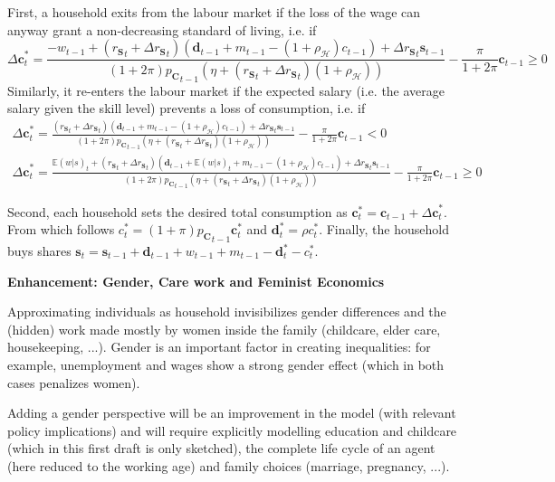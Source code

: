 \documentclass[a4paper, headings=standardclasses]{scrartcl}
\newenvironment{enh}[1][]{\begin{framed}\noindent\textbf{Enhancement: #1}\par}{\end{framed}}
\begin{document}
First, a household exits from the labour market if the loss of the wage can anyway grant a non-decreasing standard of living, i.e. if
$$ {\Delta \mathbf{c}}^*_t = \frac{-w_{t-1} + ({r_\mathbf{S}}_t + {\Delta r_\mathbf{S}}_{t})(\mathbf{d}_{t-1} + m_{t-1} - (1+\rho_{\mathcal{H}}) c_{t-1}) + {\Delta r_\mathbf{S}}_{t} \mathbf{s}_{t-1}}{(1+2\pi){p_\mathbf{C}}_{t-1}(\eta +  ({r_\mathbf{S}}_t + {\Delta r_\mathbf{S}}_{t})(1+\rho_{\mathcal{H}}))} - \frac{\pi}{1+2\pi}{\mathbf{c}_{t-1}} \ge 0$$
Similarly, it re-enters the labour market if the expected salary (i.e. the average salary given the skill level) prevents a loss of consumption, i.e. if
\begin{multline*}
	{\Delta \mathbf{c}}^*_t = \frac{({r_\mathbf{S}}_t + {\Delta r_\mathbf{S}}_{t})(\mathbf{d}_{t-1} + m_{t-1} - (1+\rho_{\mathcal{H}}) c_{t-1}) + {\Delta r_\mathbf{S}}_{t} \mathbf{s}_{t-1}}{(1+2\pi){p_\mathbf{C}}_{t-1}(\eta +  ({r_\mathbf{S}}_t + {\Delta r_\mathbf{S}}_{t})(1+\rho_{\mathcal{H}}))} - \frac{\pi}{1+2\pi}{\mathbf{c}_{t-1}} < 0 \\
	{\Delta \mathbf{c}}^*_t = \frac{{\mathbb{E}(w|s)}_{t} + ({r_\mathbf{S}}_t + {\Delta r_\mathbf{S}}_{t})(\mathbf{d}_{t-1} + {\mathbb{E}(w|s)}_{t} + m_{t-1} - (1+\rho_{\mathcal{H}}) c_{t-1}) + {\Delta r_\mathbf{S}}_{t} \mathbf{s}_{t-1}}{(1+2\pi){p_\mathbf{C}}_{t-1}(\eta +  ({r_\mathbf{S}}_t + {\Delta r_\mathbf{S}}_{t})(1+\rho_{\mathcal{H}}))} - \frac{\pi}{1+2\pi}{\mathbf{c}_{t-1}} \ge 0
\end{multline*}

Second, each household sets the desired total consumption as $\mathbf{c}^*_t = \mathbf{c}_{t-1} + {\Delta \mathbf{c}}^*_t$. From which follows $c^*_t = (1+\pi) {p_\mathbf{C}}_{t-1} \mathbf{c}^*_t$ and $\mathbf{d}^*_t = \rho c^*_t$. Finally, the household buys shares $\mathbf{s}_t = \mathbf{s}_{t-1} + \mathbf{d}_{t-1} + w_{t-1} + m_{t-1} - \mathbf{d}^*_t - c^*_t$.

\begin{enh}[Gender, Care work and Feminist Economics]
	Approximating individuals as household invisibilizes gender differences and the (hidden) work made mostly by women inside the family (childcare, elder care, housekeeping, ...).
	Gender is an important factor in creating inequalities: for example, unemployment and wages show a strong gender effect (which in both cases penalizes women).

	Adding a gender perspective will be an improvement in the model (with relevant policy implications) and will require explicitly modelling education and childcare (which in this first draft is only sketched), the complete life cycle of an agent (here reduced to the working age) and family choices (marriage, pregnancy, ...).
\end{enh}
\end{document}
